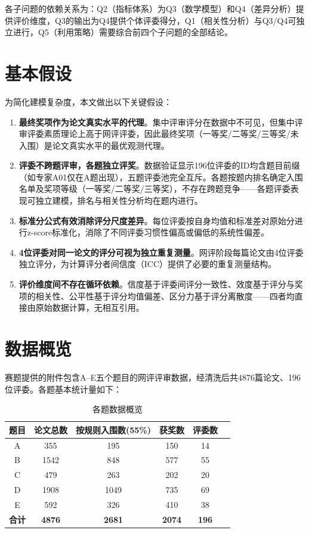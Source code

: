 \documentclass[UTF8,12pt]{ctexart}
\begin{document}
各子问题的依赖关系为：Q2（指标体系）为Q3（数学模型）和Q4（差异分析）提供评价维度，Q3的输出为Q4提供个体评委得分，Q1（相关性分析）与Q3/Q4可独立进行，Q5（利用策略）需要综合前四个子问题的全部结论。

\section{基本假设}

为简化建模复杂度，本文做出以下关键假设：

\begin{enumerate}
    \item \textbf{最终奖项作为论文真实水平的代理}。集中评审评分在数据中不可见，但集中评审评委素质理论上高于网评评委，因此最终奖项（一等奖/二等奖/三等奖/未入围）是论文真实水平的最优观测代理。
    \item \textbf{评委不跨题评审，各题独立评奖}。数据验证显示196位评委的ID均含题目前缀（如专家A01仅在A题出现），五题评委池完全互斥。各题按题内排名确定入围名单及奖项等级（一等奖/二等奖/三等奖），不存在跨题竞争——各题评委表现可独立建模，排名与相关性分析均在题内进行。
    \item \textbf{标准分公式有效消除评分尺度差异}。每位评委按自身均值和标准差对原始分进行z-score标准化，消除了不同评委习惯性偏高或偏低的系统性偏差。
    \item \textbf{4位评委对同一论文的评分可视为独立重复测量}。网评阶段每篇论文由4位评委独立评分，为计算评分者间信度（ICC）提供了必要的重复测量结构。
    \item \textbf{评价维度间不存在循环依赖}。信度基于评委间评分一致性、效度基于评分与奖项的相关性、公平性基于评分均值偏差、区分力基于评分离散度——四者均直接由原始数据计算，无相互引用。
\end{enumerate}

\section{数据概览}

赛题提供的附件包含A--E五个题目的网评评审数据，经清洗后共4876篇论文、196位评委。各题基本统计量如下：

\begin{table}[H]
\centering
\caption{各题数据概览}
\begin{tabular}{cccccc}
\toprule
题目 & 论文总数 & 按规则入围数(55\%) & 获奖数 & 评委数 \\
\midrule
A & 355 & 195 & 150 & 14 \\
B & 1542 & 848 & 577 & 55 \\
C & 479 & 263 & 202 & 20 \\
D & 1908 & 1049 & 735 & 69 \\
E & 592 & 326 & 410 & 38 \\
\textbf{合计} & \textbf{4876} & \textbf{2681} & \textbf{2074} & \textbf{196} \\
\bottomrule
\end{tabular}
\end{table}
\end{document}
